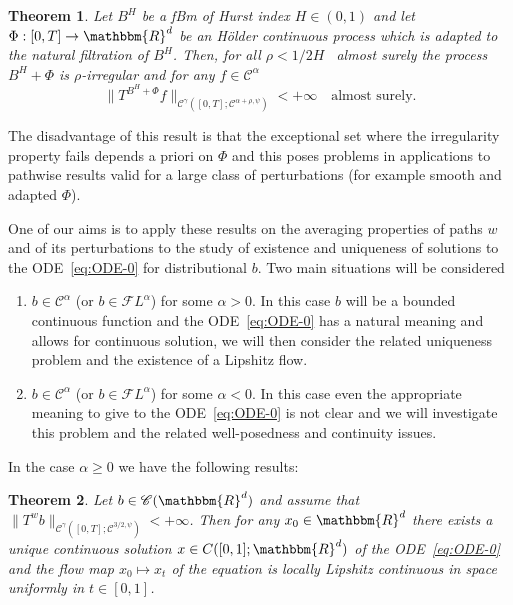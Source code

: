 \documentclass[a4paper,11pt]{article}
\newenvironment{enumeratenumeric}{\begin{enumerate}[1.] }{\end{enumerate}}
\newtheorem{theorem}{Theorem}[section]
\newcommand{\CC}{\mathscr C}
\newcommand{\CF}{\mathscr F}
\begin{document}
\begin{theorem}
  \label{th:perturbed-girsanov}Let $B^{H}$ be a fBm of Hurst index $H \in (
  0,1 )$ and let $\Phi : [ 0,T ] \rightarrow \mathbbm{R}^{d}$ be an Hölder
  continuous process which is adapted to the natural filtration of $B^H$. Then,
  for all $\rho <1/2H$ \ almost surely the process $B^H+ \Phi$ is
  $\rho$-irregular and for any $f \in \CC^{\alpha}$
  \[ \| T^{B^H+ \Phi}_{} f \|_{\CC^{\gamma} \left( [ 0,T ] ; \CC^{\alpha + \rho ,
     \psi} \right)} <+ \infty \quad \text{almost surely.}\]

\end{theorem}

The disadvantage of this result is that the exceptional set where the
irregularity property fails depends a priori on $\Phi$ and this poses problems
in applications to pathwise results valid for a large class of perturbations
(for example smooth and adapted $\Phi$).



One of our aims is to apply these results on the averaging properties of
paths $w$ and of its perturbations to the study of existence and uniqueness of
solutions to the ODE~{\eqref{eq:ODE-0}} for distributional $b$. Two main
situations will be considered
\begin{enumeratenumeric}
  \item $b \in \CC^{\alpha}$ (or $b \in \CF L^{\alpha}$) for some $\alpha >0$.
  In this case $b$ will be a bounded continuous function and the
  ODE~{\eqref{eq:ODE-0}} has a natural meaning and allows for continuous
  solution, we will then consider the related uniqueness problem and the
  existence of a Lipshitz flow.
  
  \item $b \in \CC^{\alpha}$ (or $b \in \CF L^{\alpha}$) for some $\alpha <0$.
  In this case even the appropriate meaning to give to the
  ODE~{\eqref{eq:ODE-0}} is not clear and we will investigate this problem and
  the related well-posedness and continuity issues.
\end{enumeratenumeric}
In the case $\alpha \geqslant 0$ we have the following results:

\begin{theorem}
  \label{th:ode-flow-0}Let $b \in \CC ( \mathbbm{R}^{d} )$ and assume that
  $\|T^{w} b\|_{\CC^{\gamma} ( [ 0,T ] ; \CC^{3/2, \psi} )} <+ \infty$. Then for
  any $x_{0} \in \mathbbm{R}^{d}$ there exists a unique continuous solution $x
  \in C ([0,1];\mathbbm{R}^{d} )$ of the ODE~{\eqref{eq:ODE-0}} and the flow
  map $x_{0} \mapsto x_{t}$ of the equation is locally Lipshitz continuous in
  space uniformly in $t \in [0,1]$.
\end{theorem}
\end{document}
